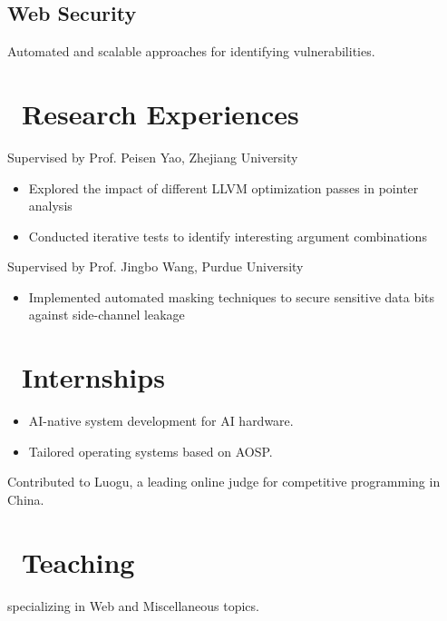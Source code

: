 \documentclass{resume}
\begin{document}
\subsection{\textbf{Web Security}}
Automated and scalable approaches for identifying vulnerabilities.

\section{\faSearch\ Research Experiences}
Supervised by Prof. Peisen Yao, Zhejiang University  
\begin{itemize}[itemsep=0.5ex]  
  \item Explored the impact of different LLVM optimization passes in pointer analysis  
  \item Conducted iterative tests to identify interesting argument combinations  
\end{itemize}

Supervised by Prof. Jingbo Wang, Purdue University
\begin{itemize}[itemsep=0.5ex]  
  \item Implemented automated masking techniques to secure sensitive data bits against side-channel leakage  
\end{itemize}

\section{\faUsers\ Internships}
\begin{itemize}
  \item AI-native system development for AI hardware.
  \item Tailored operating systems based on AOSP.
\end{itemize}

Contributed to Luogu, a leading online judge for competitive programming in China.

\section{\faBook\ Teaching}
specializing in Web and Miscellaneous topics.
\end{document}

